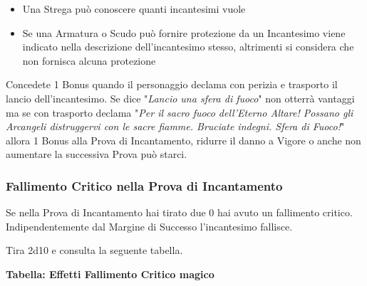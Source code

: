 \documentclass[12pt,a4paper,twoside,openany]{book}
\begin{document}
\begin{multicols}{2}
\begin{itemize}
\item 
Una Strega può conoscere quanti incantesimi vuole

\item 
Se una Armatura o Scudo può fornire protezione da un Incantesimo viene indicato nella descrizione dell'incantesimo stesso, altrimenti si considera che non fornisca alcuna protezione

\end{itemize}

\begin{changemargin}{0.3cm}{0.3cm}\begin{narratore}
Concedete 1 Bonus quando il personaggio declama con perizia e trasporto il lancio dell'incantesimo. Se dice "\textit{Lancio una sfera di fuoco}" non otterrà vantaggi ma se con trasporto declama "\textit{Per il sacro fuoco dell'Eterno Altare! Possano gli Arcangeli distruggervi con le sacre fiamme. Bruciate indegni. Sfera di Fuoco!}" allora 1 Bonus alla Prova di Incantamento, ridurre il danno a Vigore o anche non aumentare la successiva Prova può starci.
\end{narratore}\end{changemargin}


\subsubsection{Fallimento Critico nella Prova di Incantamento}\label{magiefallimentocriticonellaprovadimagia}

Se nella Prova di Incantamento hai tirato due 0 hai avuto un fallimento critico. Indipendentemente dal Margine di Successo l'incantesimo fallisce.

Tira 2d10 e consulta la seguente tabella.


\textbf{Tabella: Effetti Fallimento Critico magico}


\end{multicols}
\end{document}
